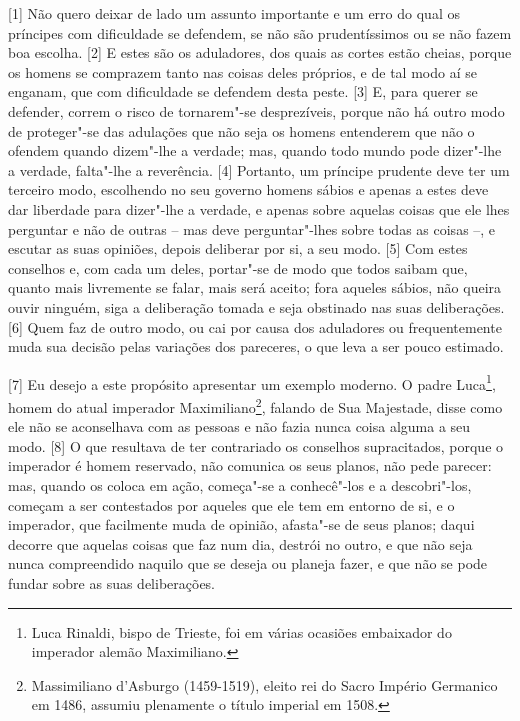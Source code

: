 {[}1{]} Não quero deixar de lado um assunto importante e um erro do qual
os príncipes com dificuldade se defendem, se não são prudentíssimos ou
se não fazem boa escolha. {[}2{]} E estes são os aduladores, dos quais
as cortes estão cheias, porque os homens se comprazem tanto nas coisas
deles próprios, e de tal modo aí se enganam, que com dificuldade se
defendem desta peste. {[}3{]} E, para querer se defender, correm o risco
de tornarem"-se desprezíveis, porque não há outro modo de proteger"-se das
adulações que não seja os homens entenderem que não o ofendem quando
dizem"-lhe a verdade; mas, quando todo mundo pode dizer"-lhe a verdade,
falta"-lhe a reverência. {[}4{]} Portanto, um príncipe prudente deve ter
um terceiro modo, escolhendo no seu governo homens sábios e apenas a
estes deve dar liberdade para dizer"-lhe a verdade, e apenas sobre
aquelas coisas que ele lhes perguntar e não de outras -- mas deve
perguntar"-lhes sobre todas as coisas --, e escutar as suas opiniões,
depois deliberar por si, a seu modo. {[}5{]} Com estes conselhos e, com
cada um deles, portar"-se de modo que todos saibam que, quanto mais
livremente se falar, mais será aceito; fora aqueles sábios, não queira
ouvir ninguém, siga a deliberação tomada e seja obstinado nas suas
deliberações. {[}6{]} Quem faz de outro modo, ou cai por causa dos
aduladores ou frequentemente muda sua decisão pelas variações dos
pareceres, o que leva a ser pouco estimado.

{[}7{]} Eu desejo a este propósito apresentar um exemplo moderno. O
padre Luca\footnote{Luca Rinaldi, bispo de Trieste, foi em várias
  ocasiões embaixador do imperador alemão Maximiliano.}, homem do atual
imperador Maximiliano\footnote{Massimiliano d'Asburgo (1459-1519),
  eleito rei do Sacro Império Germanico em 1486, assumiu plenamente o
  título imperial em 1508.}, falando de Sua Majestade, disse como ele
não se aconselhava com as pessoas e não fazia nunca coisa alguma a seu
modo. {[}8{]} O que resultava de ter contrariado os conselhos
supracitados, porque o imperador é homem reservado, não comunica os seus
planos, não pede parecer: mas, quando os coloca em ação, começa"-se a
conhecê"-los e a descobri"-los, começam a ser contestados por aqueles que
ele tem em entorno de si, e o imperador, que facilmente muda de opinião,
afasta"-se de seus planos; daqui decorre que aquelas coisas que faz num
dia, destrói no outro, e que não seja nunca compreendido naquilo que se
deseja ou planeja fazer, e que não se pode fundar sobre as suas
deliberações.

